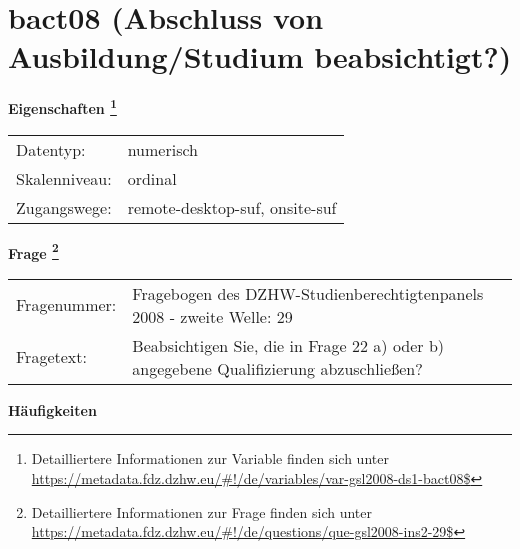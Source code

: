 
    \setcounter{footnote}{0}

    \vspace*{-1.8cm}
	\section{bact08 (Abschluss von Ausbildung/Studium beabsichtigt?)}
	\label{section:bact08}



    \vspace*{0.5cm}
    \noindent\textbf{Eigenschaften
	\footnote{Detailliertere Informationen zur Variable finden sich unter
		\url{https://metadata.fdz.dzhw.eu/\#!/de/variables/var-gsl2008-ds1-bact08$}}}\\
	\begin{tabularx}{\hsize}{@{}lX}
	Datentyp: & numerisch \\
	Skalenniveau: & ordinal \\
	Zugangswege: &
	  remote-desktop-suf, 
	  onsite-suf
 \\
    \end{tabularx}



				\vspace*{0.5cm}
                \noindent\textbf{Frage
	                \footnote{Detailliertere Informationen zur Frage finden sich unter
		              \url{https://metadata.fdz.dzhw.eu/\#!/de/questions/que-gsl2008-ins2-29$}}}\\
				\begin{tabularx}{\hsize}{@{}lX}
					Fragenummer: &
					  Fragebogen des DZHW-Studienberechtigtenpanels 2008 - zweite Welle:
					  29
 \\
					Fragetext: & Beabsichtigen Sie, die in Frage 22 a) oder b) angegebene Qualifizierung abzuschließen? \\
				\end{tabularx}





        		\vspace*{0.5cm}
                \noindent\textbf{Häufigkeiten}

